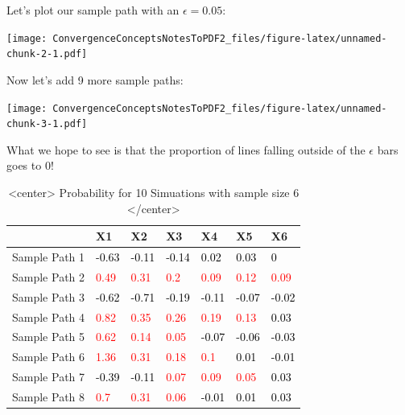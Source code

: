 \documentclass[
]{article}
\begin{document}
Let's plot our sample path with an \(\epsilon = 0.05\):

\texttt{[image: ConvergenceConceptsNotesToPDF2\_files/figure-latex/unnamed-chunk-2-1.pdf]}

Now let's add 9 more sample paths:

\texttt{[image: ConvergenceConceptsNotesToPDF2\_files/figure-latex/unnamed-chunk-3-1.pdf]}

What we hope to see is that the proportion of lines falling outside of
the \(\epsilon\) bars goes to 0!

\begin{table}

\caption{\label{tab:unnamed-chunk-4}<center> Probability for 10 Simuations 
                  with sample size 6 </center>}
\centering
\begin{tabu} to 
\hline
  & X1 & X2 & X3 & X4 & X5 & X6\\
\hline
Sample Path 1 & \textcolor{black}{-0.63} & \textcolor{black}{-0.11} & \textcolor{black}{-0.14} & \textcolor{black}{0.02} & \textcolor{black}{0.03} & \textcolor{black}{0}\\
\hline
Sample Path 2 & \textcolor{red}{0.49} & \textcolor{red}{0.31} & \textcolor{red}{0.2} & \textcolor{red}{0.09} & \textcolor{red}{0.12} & \textcolor{red}{0.09}\\
\hline
Sample Path 3 & \textcolor{black}{-0.62} & \textcolor{black}{-0.71} & \textcolor{black}{-0.19} & \textcolor{black}{-0.11} & \textcolor{black}{-0.07} & \textcolor{black}{-0.02}\\
\hline
Sample Path 4 & \textcolor{red}{0.82} & \textcolor{red}{0.35} & \textcolor{red}{0.26} & \textcolor{red}{0.19} & \textcolor{red}{0.13} & \textcolor{black}{0.03}\\
\hline
Sample Path 5 & \textcolor{red}{0.62} & \textcolor{red}{0.14} & \textcolor{red}{0.05} & \textcolor{black}{-0.07} & \textcolor{black}{-0.06} & \textcolor{black}{-0.03}\\
\hline
Sample Path 6 & \textcolor{red}{1.36} & \textcolor{red}{0.31} & \textcolor{red}{0.18} & \textcolor{red}{0.1} & \textcolor{black}{0.01} & \textcolor{black}{-0.01}\\
\hline
Sample Path 7 & \textcolor{black}{-0.39} & \textcolor{black}{-0.11} & \textcolor{red}{0.07} & \textcolor{red}{0.09} & \textcolor{red}{0.05} & \textcolor{black}{0.03}\\
\hline
Sample Path 8 & \textcolor{red}{0.7} & \textcolor{red}{0.31} & \textcolor{red}{0.06} & \textcolor{black}{-0.01} & \textcolor{black}{0.01} & \textcolor{black}{0.03}\\

\end{tabu}
\end{table}
\end{document}

